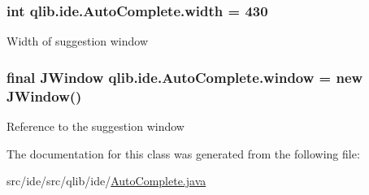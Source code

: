 \subsubsection[{\texorpdfstring{width}{width}}]{\setlength{\rightskip}{0pt plus 5cm}int qlib.\+ide.\+Auto\+Complete.\+width = 430\hspace{0.3cm}{\ttfamily [private]}}\hypertarget{classqlib_1_1ide_1_1AutoComplete_a312cdabc82431a5cc8d73c1884c416a7}{}\label{classqlib_1_1ide_1_1AutoComplete_a312cdabc82431a5cc8d73c1884c416a7}
Width of suggestion window 
\subsubsection[{\texorpdfstring{window}{window}}]{\setlength{\rightskip}{0pt plus 5cm}final J\+Window qlib.\+ide.\+Auto\+Complete.\+window = new J\+Window()\hspace{0.3cm}{\ttfamily [private]}}\hypertarget{classqlib_1_1ide_1_1AutoComplete_a858e66824f2ef4066d9987b4206037a2}{}\label{classqlib_1_1ide_1_1AutoComplete_a858e66824f2ef4066d9987b4206037a2}
Reference to the suggestion window 

The documentation for this class was generated from the following file\+:\begin{DoxyCompactItemize}
\item 
src/ide/src/qlib/ide/\hyperlink{AutoComplete_8java}{Auto\+Complete.\+java}\end{DoxyCompactItemize}
